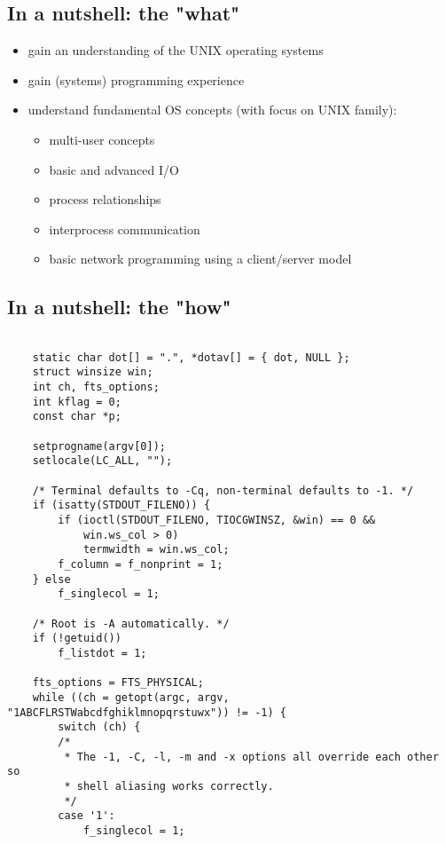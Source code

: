 \documentclass[xga]{xdvislides}
\begin{document}
\subsection{In a nutshell: the "what"}
\begin{itemize}
	\item gain an understanding of the UNIX operating systems
	\item gain (systems) programming experience
	\item understand fundamental OS concepts (with focus on UNIX family):
		\begin{itemize}
			\item multi-user concepts
			\item basic and advanced I/O
			\item process relationships
			\item interprocess communication
			\item basic network programming using a client/server model
		\end{itemize}
\end{itemize}

\subsection{In a nutshell: the "how"}
\small
\begin{verbatim}

    static char dot[] = ".", *dotav[] = { dot, NULL };
    struct winsize win;
    int ch, fts_options;
    int kflag = 0;
    const char *p;

    setprogname(argv[0]);
    setlocale(LC_ALL, "");

    /* Terminal defaults to -Cq, non-terminal defaults to -1. */
    if (isatty(STDOUT_FILENO)) {
        if (ioctl(STDOUT_FILENO, TIOCGWINSZ, &win) == 0 &&
            win.ws_col > 0)
            termwidth = win.ws_col;
        f_column = f_nonprint = 1;
    } else
        f_singlecol = 1;

    /* Root is -A automatically. */
    if (!getuid())
        f_listdot = 1;

    fts_options = FTS_PHYSICAL;
    while ((ch = getopt(argc, argv, "1ABCFLRSTWabcdfghiklmnopqrstuwx")) != -1) {
        switch (ch) {
        /*
         * The -1, -C, -l, -m and -x options all override each other so
         * shell aliasing works correctly.
         */
        case '1':
            f_singlecol = 1;
\end{verbatim}
\Normalsize
\end{document}
